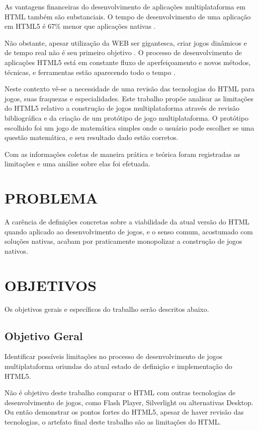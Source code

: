 As vantagens financeiras do desenvolvimento de aplicações
multiplataforma em HTML também são substanciais. O tempo de
desenvolvimento de uma aplicação em HTML5 é 67\% menor que
aplicações nativas \autocite[p. 460]{html5Tradeoffs}.

Não obstante, apesar utilização da WEB ser gigantesca, criar
jogos dinâmicos e de tempo real não é seu primeiro objetivo
\autocite{html5mostwanted}. O processo de desenvolvimento de
aplicações HTML5 está em constante fluxo de aperfeiçoamento e novos
métodos, técnicas, e ferramentas estão aparecendo todo o tempo
\autocite{crossPlatformMobileGame}.

Neste contexto vê-se a necessidade de uma revisão das tecnologias do
HTML para jogos, suas fraquezas e especialidades. Este trabalho propõe
analisar as limitações do HTML5 relativo a construção de
jogos multiplataforma através de revisão bibliográfica e da criação
de um protótipo de jogo multiplataforma. O protótipo escolhido foi
um jogo de matemática simples onde o usuário pode escolher se uma
questão matemática, e seu resultado dado estão corretos.

Com as informações coletas de maneira prática e teórica foram
registradas as limitações e uma análise sobre elas foi efetuada.

\section{PROBLEMA}
A carência de definições concretas sobre a viabilidade da atual
versão do HTML quando aplicado ao desenvolvimento de jogos, e o senso
comum, acostumado com soluções nativas, acabam por praticamente
monopolizar a construção de jogos nativos.
\section{OBJETIVOS}

Os objetivos gerais e específicos do trabalho serão descritos abaixo.

\subsection{Objetivo Geral}

Identificar possíveis limitações no processo de desenvolvimento
de jogos multiplataforma oriundas do atual estado de definição e
implementação do HTML5.

Não é objetivo deste trabalho comparar o HTML com outras tecnologias
de desenvolvimento de jogos, como Flash Player, Silverlight ou
alternativas Desktop. Ou então demonstrar os pontos fortes do HTML5,
apesar de haver revisão das tecnologias, o artefato final deste
trabalho são as limitações do HTML.

